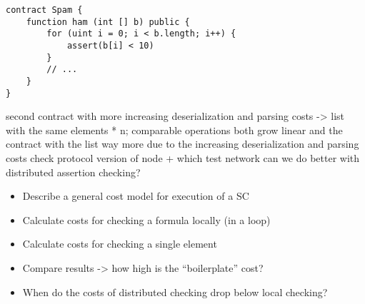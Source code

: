 \begin{lstlisting}[numbers=none, language=Solidity]
contract Spam {
	function ham (int [] b) public {
		for (uint i = 0; i < b.length; i++) {
			assert(b[i] < 10)
		}
		// ...
	}
}
\end{lstlisting}

second contract with more increasing deserialization and parsing costs -> list with the same elements * n; comparable operations
both grow linear and the contract with the list way more due to the increasing deserialization and parsing costs
check protocol version of node + which test network
can we do better with distributed assertion checking?

\begin{itemize}
\item Describe a general cost model for execution of a SC
\item Calculate costs for checking a formula locally (in a loop)
\item Calculate costs for checking a single element
\item Compare results -> how high is the ``boilerplate'' cost?
\item When do the costs of distributed checking drop below local checking?
\end{itemize}